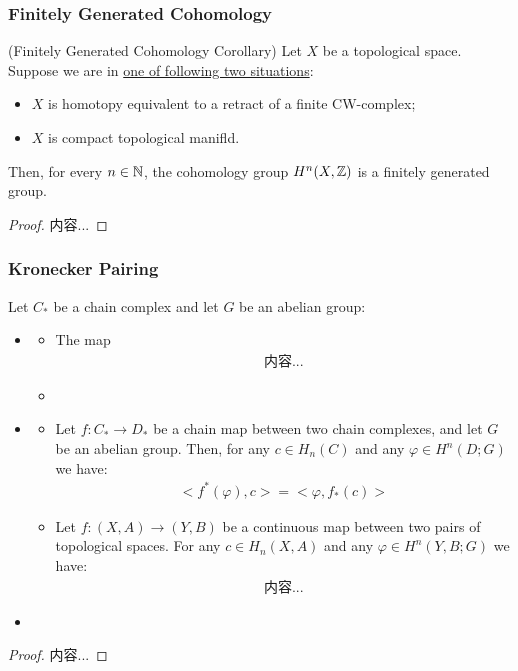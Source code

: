 \documentclass[Total.tex]{subfiles}
\begin{document}
					\subsubsection{Finitely Generated Cohomology}
					\begin{corollary}
						(Finitely Generated Cohomology Corollary) Let $X$ be a topological space. Suppose we are in \underline{one of following two situations}:
						\begin{itemize}
							\item $X$ is homotopy equivalent to a retract of a finite CW-complex;
							\item $X$ is compact topological manifld.
						\end{itemize}
						Then, for every $n\in \mathbb{N}$, the cohomology group $H^n(X,\mathbb{Z})$ is a finitely generated group.
					\end{corollary}
					\begin{proof}
						内容...
					\end{proof}
					\subsubsection{Kronecker Pairing}
						\begin{lemma}
							Let $C_*$ be a chain complex and let $G$ be an abelian group:
							\begin{itemize}
								\item \begin{itemize}
									\item The map
									\begin{gather*}
										内容...
									\end{gather*}
									\item 
								\end{itemize}
								\item \begin{itemize}
									\item Let $f:C_*\rightarrow D_*$ be a chain map between two chain complexes, and let $G$ be an abelian group. Then, for any $c\in H_n(C)$ and any $\varphi\in H^n(D;G)$ we have:
									\begin{gather*}
										<f^*(\varphi),c>=<\varphi,f_*(c)>
									\end{gather*}
									\item Let $f:(X,A)\rightarrow (Y,B)$ be a continuous map between two pairs of topological spaces. For any $c\in H_n(X,A)$ and any $\varphi\in H^n(Y,B;G)$ we have:
									\begin{gather*}
										内容...
									\end{gather*}
								\end{itemize}
								\item 
							\end{itemize}
						\end{lemma}
						\begin{proof}
							内容...
						\end{proof}
						
\end{document}
